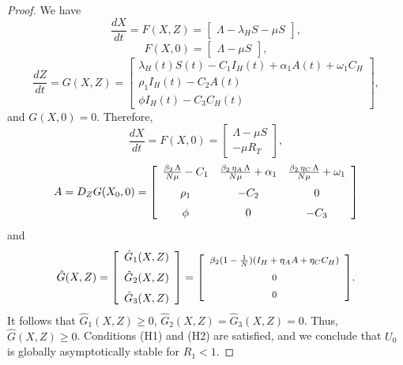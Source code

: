 \documentclass{my_aims}
\theoremstyle{definition}
\begin{document}
\begin{proof}
We have
\begin{equation*}
\frac{dX}{dt} = F(X, Z)
= \left[
\begin{array}{c}
\Lambda - \lambda_H S - \mu S
\end{array} \right],
\end{equation*}
\begin{equation*}
F(X, 0) = \left[ \begin{array}{c}
\Lambda - \mu S
\end{array} \right],
\end{equation*}
\begin{equation*}
\frac{dZ}{dt} = G(X, Z)
 = \left[
\begin{array}{c}
\lambda_H(t) S(t) - C_1 I_H(t) + \alpha_1 A(t)  + \omega_1 C_H \\[0.2 cm]
\rho_1 I_H(t) - C_2 A(t)\\[0.2 cm]
\phi I_H(t) - C_3 C_H(t)
\end{array}
\right],
\end{equation*}
and $G(X, 0) = 0$. Therefore,
\begin{equation*}
\frac{dX}{dt} = F(X, 0) = \left[
\begin{array}{c}
\Lambda - \mu S \\[0.2 cm]
- \mu R_T
\end{array} \right],
\end{equation*}
\begin{equation*}
A = D_Z G(X_0, 0) =
\left[ \begin{array}{ccc}
{\frac {\beta_2 \,\Lambda}{N\mu}}-C_1&{\frac {\beta_2\,\eta_A\,\Lambda}{N\mu}}
+\alpha_1&{\frac{\beta_2 \,\eta_C \,\Lambda}{N\mu}}+\omega_1\\
\noalign{\medskip} \rho_1 &-C_2&0\\
\noalign{\medskip} \phi&0&-C_3
\end{array} \right]
\end{equation*}
and
\begin{equation}
\label{eq:hat:G}
\hat{G}(X, Z)
= \left[
\begin{array}{c}
\hat{G}_1(X, Z)\\[0.2 cm]
\hat{G}_2(X, Z)\\[0.2 cm]
\hat{G}_3(X, Z)
\end{array}
\right]
= {\footnotesize{  \left[ \begin {array}{c}
\beta_2(1-\frac{1}{N})(I_H + \eta_A A + \eta_C C_H)\\
\noalign{\medskip}
0\\ \noalign{\medskip}
0
\end {array} \right] }}.
\end{equation}
It follows that $\hat{G}_1(X, Z) \geq 0$, $\hat{G}_2(X, Z) = \hat{G}_3(X, Z) = 0$.
Thus, $\hat{G}(X, Z) \geq 0$. Conditions (H1) and (H2) are satisfied,
and we conclude that $U_0$ is globally asymptotically stable for $R_1 < 1$.
\end{proof}
\end{document}
